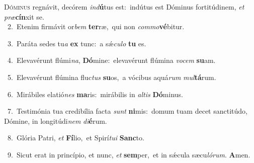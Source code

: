 \lettrine{\initial\textcolor{\initialcolor}{D}}{óminus} regnávit, decórem \textit{ind}\-\textbf{ú}tus est:~\star indútus est Dóminus fortitúdinem, \textit{et} \textit{præ}\-\textbf{cín}xit se.\\
{\numbfont\textcolor{\numbcolor}{~2.}}~Etenim firmávit or\textit{bem} \textbf{ter}\-ræ,~\star qui non \textit{com}\-\textit{mo}\textbf{vé}bitur.\par
{\numbfont\textcolor{\numbcolor}{~3.}}~Paráta sedes tu\textit{a} \textbf{ex} tunc:~\star a sǽ\-\textit{cu}\-\textit{lo} \textbf{tu} es.\par
{\numbfont\textcolor{\numbcolor}{~4.}}~Elevavérunt flúmi\-\textit{na}\-, \textbf{Dó}\-mine:~\star elevavérunt flúmina \textit{vo}\-\textit{cem} \textbf{su}\-am.\par
{\numbfont\textcolor{\numbcolor}{~5.}}~Elevavérunt flúmina fluc\textit{tus} \textbf{su}\-os,~\star a vócibus aquá\textit{rum} \textit{mul}\-\textbf{tá}rum.\par
{\numbfont\textcolor{\numbcolor}{~6.}}~Mirábiles elatió\textit{nes} \textbf{ma}\-ris:~\star mirábilis in \textit{al}\-\textit{tis} \textbf{Dó}\-minus.\par
{\numbfont\textcolor{\numbcolor}{~7.}}~Testimónia tua credibília facta \textit{sunt} \textbf{ni}\-mis:~\star domum tuam decet sanctitúdo, Dómine, in longitúdi\textit{nem} \textit{di}\-\textbf{é}rum.\par
{\numbfont\textcolor{\numbcolor}{~8.}}~Glória Patri, \textit{et} \textbf{Fí}\-lio,~\star et Spirí\-\textit{tu}\-\textit{i} \textbf{Sanc}\-to.\par
{\numbfont\textcolor{\numbcolor}{~9.}}~Sicut erat in princípio, et nunc, \textit{et} \textbf{sem}\-per,~\star et in sǽcula sæcu\-\textit{ló}\-\textit{rum}. \textbf{A}\-men.\par
